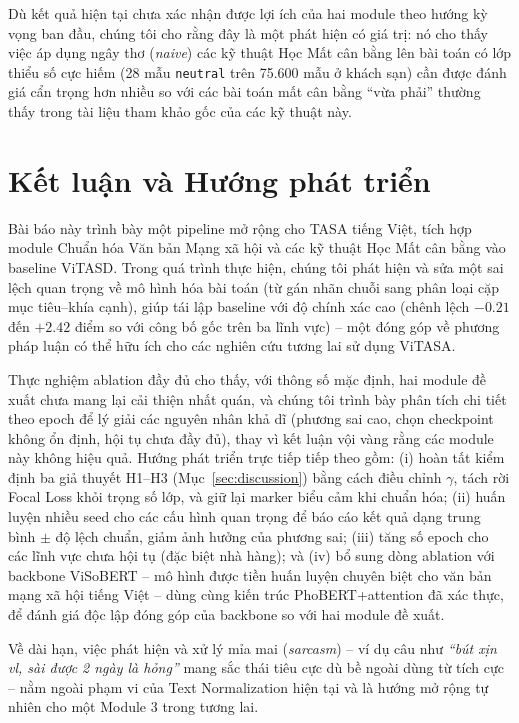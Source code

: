 \documentclass[11pt]{article}
\begin{document}
Dù kết quả hiện tại chưa xác nhận được lợi ích của hai module theo hướng kỳ vọng ban đầu, chúng tôi cho rằng đây là một phát hiện có giá trị: nó cho thấy việc áp dụng ngây thơ (\textit{naive}) các kỹ thuật Học Mất cân bằng lên bài toán có lớp thiểu số cực hiếm (28 mẫu \texttt{neutral} trên 75.600 mẫu ở khách sạn) cần được đánh giá cẩn trọng hơn nhiều so với các bài toán mất cân bằng ``vừa phải'' thường thấy trong tài liệu tham khảo gốc của các kỹ thuật này.


\section{Kết luận và Hướng phát triển}
\label{sec:conclusion}

Bài báo này trình bày một pipeline mở rộng cho TASA tiếng Việt, tích hợp module Chuẩn hóa Văn bản Mạng xã hội và các kỹ thuật Học Mất cân bằng vào baseline ViTASD. Trong quá trình thực hiện, chúng tôi phát hiện và sửa một sai lệch quan trọng về mô hình hóa bài toán (từ gán nhãn chuỗi sang phân loại cặp mục tiêu--khía cạnh), giúp tái lập baseline với độ chính xác cao (chênh lệch $-0.21$ đến $+2.42$ điểm so với công bố gốc trên ba lĩnh vực) -- một đóng góp về phương pháp luận có thể hữu ích cho các nghiên cứu tương lai sử dụng ViTASA.

Thực nghiệm ablation đầy đủ cho thấy, với thông số mặc định, hai module đề xuất chưa mang lại cải thiện nhất quán, và chúng tôi trình bày phân tích chi tiết theo epoch để lý giải các nguyên nhân khả dĩ (phương sai cao, chọn checkpoint không ổn định, hội tụ chưa đầy đủ), thay vì kết luận vội vàng rằng các module này không hiệu quả. Hướng phát triển trực tiếp tiếp theo gồm: (i) hoàn tất kiểm định ba giả thuyết H1--H3 (Mục~\ref{sec:discussion}) bằng cách điều chỉnh $\gamma$, tách rời Focal Loss khỏi trọng số lớp, và giữ lại marker biểu cảm khi chuẩn hóa; (ii) huấn luyện nhiều seed cho các cấu hình quan trọng để báo cáo kết quả dạng trung bình $\pm$ độ lệch chuẩn, giảm ảnh hưởng của phương sai; (iii) tăng số epoch cho các lĩnh vực chưa hội tụ (đặc biệt nhà hàng); và (iv) bổ sung dòng ablation với backbone ViSoBERT -- mô hình được tiền huấn luyện chuyên biệt cho văn bản mạng xã hội tiếng Việt -- dùng cùng kiến trúc PhoBERT+attention đã xác thực, để đánh giá độc lập đóng góp của backbone so với hai module đề xuất.

Về dài hạn, việc phát hiện và xử lý mỉa mai (\textit{sarcasm}) -- ví dụ câu như \textit{``bút xịn vl, sài được 2 ngày là hỏng''} mang sắc thái tiêu cực dù bề ngoài dùng từ tích cực -- nằm ngoài phạm vi của Text Normalization hiện tại và là hướng mở rộng tự nhiên cho một Module 3 trong tương lai.
\end{document}
